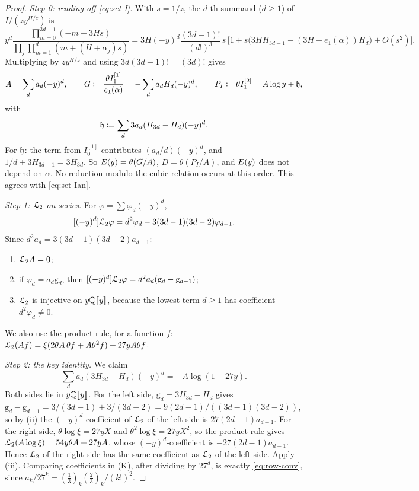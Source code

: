\begin{proof}
\emph{Step 0: reading off \eqref{eq:set-I}.} With $s=1/z$, the $d$-th summand ($d\geq1$) of $I/(zy^{H/z})$ is
\[
y^d\frac{\prod_{m=0}^{3d-1}(-m-3Hs)}{\prod_j\prod_{m=1}^{d}(m+(H+\alpha_j)s)}=3H(-y)^d\frac{(3d-1)!}{(d!)^3}\,s\,\Big[1+s\big(3HH_{3d-1}-(3H+e_1(\alpha))H_d\big)+O(s^2)\Big].
\]
Multiplying by $zy^{H/z}$ and using $3d(3d-1)!=(3d)!$ gives
\[
A=\sum_da_d(-y)^d,\qquad G\coloneqq\frac{\theta I_1^{[1]}}{e_1(\alpha)}=-\sum_da_dH_d(-y)^d,\qquad P_I\coloneqq\theta I_1^{[2]}=A\log y+\mathfrak{h},
\]
with
\[
\mathfrak{h}\coloneqq\sum_d3a_d(H_{3d}-H_d)(-y)^d.
\]
For $\mathfrak{h}$: the term from $I_0^{[1]}$ contributes $(a_d/d)(-y)^d$, and $1/d+3H_{3d-1}=3H_{3d}$. So $E(y)=\theta(G/A)$, $D=\theta(P_I/A)$, and $E(y)$ does not depend on $\alpha$. No reduction modulo the cubic relation occurs at this order. This agrees with \eqref{eq:set-Ian}.

\emph{Step 1: $\mathcal{L}_{2}$ on series.} For $\varphi=\sum\varphi_d(-y)^d$,
\[
[(-y)^d]\mathcal{L}_{2}\varphi=d^2\varphi_d-3(3d-1)(3d-2)\varphi_{d-1}.
\]
Since $d^2a_d=3(3d-1)(3d-2)a_{d-1}$:
\begin{enumerate}
\item $\mathcal{L}_{2} A=0$;
\item if $\varphi_d=a_d\mathrm{g}_d$, then $[(-y)^d]\mathcal{L}_{2}\varphi=d^2a_d(\mathrm{g}_d-\mathrm{g}_{d-1})$;
\item $\mathcal{L}_{2}$ is injective on $y\mathbb{Q}[\![ y ]\!]$, because the lowest term $d\geq1$ has coefficient $d^2\varphi_d\neq0$.
\end{enumerate}
We also use the product rule, for a function $f$: $\mathcal{L}_{2}(Af)=\xi(2\theta A\,\theta f+A\theta^2f)+27yA\theta f$.

\emph{Step 2: the key identity.} We claim
\begin{equation}
\tag{K}
\sum_da_d(3H_{3d}-H_d)(-y)^d=-A\log(1+27y).
\end{equation}
Both sides lie in $y\mathbb{Q}[\![ y ]\!]$. For the left side, $\mathrm{g}_d=3H_{3d}-H_d$ gives $\mathrm{g}_d-\mathrm{g}_{d-1}=3/(3d-1)+3/(3d-2)=9(2d-1)/((3d-1)(3d-2))$, so by (ii) the $(-y)^d$-coefficient of $\mathcal{L}_{2}$ of the left side is $27(2d-1)a_{d-1}$. For the right side, $\theta\log\xi=27yX$ and $\theta^2\log\xi=27yX^2$, so the product rule gives $\mathcal{L}_{2}(A\log\xi)=54y\theta A+27yA$, whose $(-y)^d$-coefficient is $-27(2d-1)a_{d-1}$. Hence $\mathcal{L}_{2}$ of the right side has the same coefficient as $\mathcal{L}_{2}$ of the left side. Apply (iii). Comparing coefficients in (K), after dividing by $27^d$, is exactly \eqref{eq:row-conv}, since $a_k/27^k=(\frac13)_k(\frac23)_k/(k!)^2$.


\end{proof}
